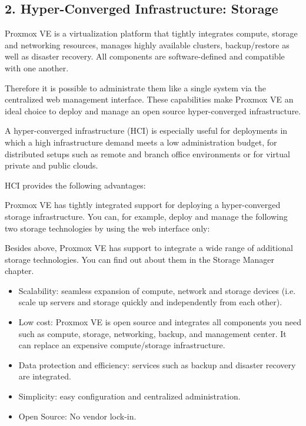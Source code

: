 \subsection{2. Hyper-Converged Infrastructure: Storage}

Proxmox VE is a virtualization platform that tightly integrates compute, storage and networking resources, manages highly available clusters, backup/restore as well as disaster recovery. All components are software-defined and compatible with one another.

Therefore it is possible to administrate them like a single system via the centralized web management interface. These capabilities make Proxmox VE an ideal choice to deploy and manage an open source hyper-converged infrastructure.

A hyper-converged infrastructure (HCI) is especially useful for deployments in which a high infrastructure demand meets a low administration budget, for distributed setups such as remote and branch office environments or for virtual private and public clouds.

HCI provides the following advantages:

Proxmox VE has tightly integrated support for deploying a hyper-converged storage infrastructure. You can, for example, deploy and manage the following two storage technologies by using the web interface only:

Besides above, Proxmox VE has support to integrate a wide range of additional storage technologies. You can find out about them in the Storage Manager chapter.

\begin{itemize}[leftmargin=2cm]

	\item Scalability: seamless expansion of compute, network and storage devices (i.e. scale up servers and storage quickly and independently from each other).

	\item Low cost: Proxmox VE is open source and integrates all components you need such as compute, storage, networking, backup, and management center. It can replace an expensive compute/storage infrastructure.

	\item Data protection and efficiency: services such as backup and disaster recovery are integrated.

	\item Simplicity: easy configuration and centralized administration.

	\item Open Source: No vendor lock-in.

\end{itemize}

